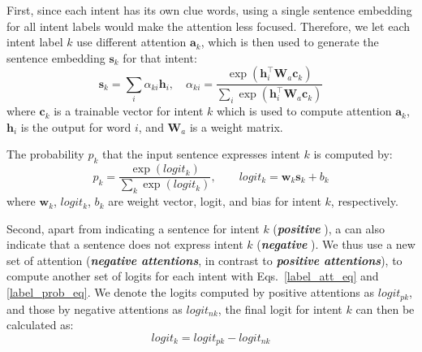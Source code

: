 First, since each intent has its own clue words, using a single sentence embedding for all intent labels %
would make the attention less focused.
Therefore, we let each intent label $k$ use different attention $\textbf{a}_k$, which is then used to generate the sentence embedding
$\textbf{s}_k$ for that intent:
\begin{equation}
\textbf{s}_k = \sum_{i}{\alpha_{ki}\textbf{h}_i}, \quad
\alpha_{ki}=\frac{\exp(\textbf{h}_i^\intercal \textbf{W}_a\textbf{c}_k)}{\sum_{i}{\exp(\textbf{h}_i^\intercal \textbf{W}_a\textbf{c}_k)}}
\label{label_att_eq}
\end{equation}
where $\textbf{c}_k$ is a trainable vector for intent $k$ which is used to compute attention $\textbf{a}_k$, $\textbf{h}_i$ is the \BLSTM output for word $i$, and $\textbf{W}_a$ is a weight matrix.

The probability $p_k$ that the input sentence expresses intent $k$ is computed by:
\begin{equation}
p_k = \frac{\exp(logit_k)}{\sum_{k}{\exp(logit_k)}}, \quad\quad logit_k=\textbf{w}_k\textbf{s}_k + b_k
\label{label_prob_eq}
\end{equation}
where $\textbf{w}_k$, $logit_k$, $b_k$ are weight vector, logit, and bias for intent $k$, respectively.

Second, apart from indicating a sentence for intent $k$ (\textbf{\emph{positive \REs}}),
a \RE can also indicate that a sentence does not express intent $k$ (\textbf{\emph{negative \REs}}).
We thus use a new set of attention (\textbf{\emph{negative attentions}}, in contrast to \textbf{\emph{positive attentions}}), to compute
another set of logits for each intent with Eqs.~\ref{label_att_eq} and \ref{label_prob_eq}. We denote the logits computed by positive
attentions as $logit_{pk}$, and those by negative attentions as $logit_{nk}$, the final logit for intent $k$ can then be calculated as:
\begin{equation}
logit_k = logit_{pk} - logit_{nk}
\end{equation}

